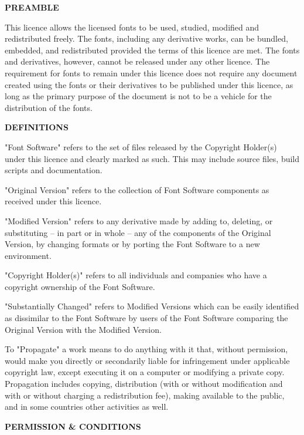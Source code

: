 
\blank

{\bf PREAMBLE}

This licence allows the licensed fonts to be used, studied, modified and redistributed freely. The fonts, including any derivative works, can be bundled, embedded, and redistributed provided the terms of this licence are met. The fonts and derivatives, however, cannot be released under any other licence. The requirement for fonts to remain under this licence does not require any document created using the fonts or their derivatives to be published under this licence, as long as the primary purpose of the document is not to be a vehicle for the distribution of the fonts.

{\bf DEFINITIONS}

"Font Software" refers to the set of files released by the Copyright Holder(s) under this licence and clearly marked as such. This may include source files, build scripts and documentation.

"Original Version" refers to the collection of Font Software components as received under this licence.

"Modified Version" refers to any derivative made by adding to, deleting, or substituting -- in part or in whole -- any of the components of the Original Version, by changing formats or by porting the Font Software to a new environment.

"Copyright Holder(s)" refers to all individuals and companies who have a copyright ownership of the Font Software.

"Substantially Changed" refers to Modified Versions which can be easily identified as dissimilar to the Font Software by users of the Font Software comparing the Original Version with the Modified Version.

To "Propagate" a work means to do anything with it that, without permission, would make you directly or secondarily liable for infringement under applicable copyright law, except executing it on a computer or modifying a private copy. Propagation includes copying, distribution (with or without modification and with or without charging a redistribution fee), making available to the public, and in some countries other activities as well.

{\bf PERMISSION & CONDITIONS}

